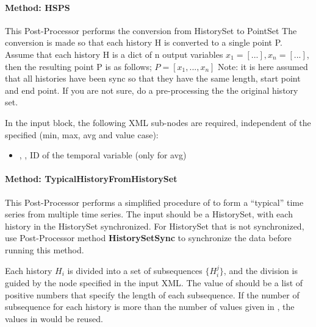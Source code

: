\paragraph{Method: HSPS}

This Post-Processor performs the conversion from HistorySet to PointSet
The conversion is made so that each history H is converted to a single point P.
Assume that each history H is a dict of n output variables $x_1=[...],x_n=[...]$, then the resulting point P is as follows; $P=[x_1,...,x_n]$
Note: it is here assumed that all histories have been sync so that they have the same length, start point and end point. If you are not sure, do a pre-processing the the original history set.

In the  input block, the following XML sub-nodes are required,
independent of the  specified (min, max, avg and value case):

\begin{itemize}
   \item {}, , ID of the temporal variable (only for avg)
\end{itemize}

\paragraph{Method: TypicalHistoryFromHistorySet}
This Post-Processor performs a simplified procedure of \cite{wilcox2008users} to form a ``typical'' time series from multiple time series. The input should be a HistorySet, with each history in the HistorySet synchronized. For HistorySet that is not synchronized, use Post-Processor method \textbf{HistorySetSync}  to synchronize the data before running this method.

Each history $H_i$ is divided into a set of subsequences $\{H_i^j\}$, and the division is guided by the  node specified in the input XML. The value of  should be a list of positive numbers that specify the length of each subsequence. If the number of subsequence for each history is more than the number of values given in , the values in  would be reused.

